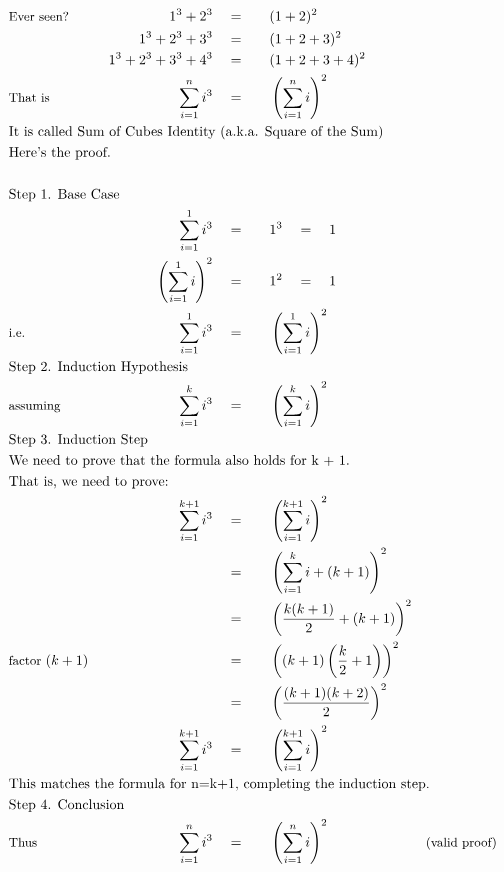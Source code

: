 \begin{alignat*}{5}
&\small\text{Ever seen?}\qquad&1^3+2^3\quad&=\quad&&(1+2)^2\\
&\,&1^3+2^3+3^3\quad&=&&(1+2+3)^2\\
&\,&1^3+2^3+3^3+4^3\quad&=&&(1+2+3+4)^2\\
&\small\text{That is}&\sum_{i=1}^{n}i^3\quad&=&&\left(\sum_{i=1}^{n}i\right)^2\\
&\rlap{\text{It is called Sum of Cubes Identity (a.k.a. Square of the Sum)}}\\
&\rlap{\text{Here's the proof.}}\\ \\
&\rlap{\text{Step 1. Base Case}}\\
&\,&\sum_{i=1}^{1}i^3\quad&=&&1^3\quad=\quad1\\
&\,&\left(\sum_{i=1}^{1}i\right)^2\quad&=&&1^2\quad=\quad1\\
&\small\text{i.e.}&\sum_{i=1}^{1}i^3\quad&=&&\left(\sum_{i=1}^{1}i\right)^2\\
&\rlap{\text{Step 2. Induction Hypothesis}}\\
&\small\text{assuming}&\sum_{i=1}^{k}i^3\quad&=&&\left(\sum_{i=1}^{k}i\right)^2\\
&\rlap{\text{Step 3. Induction Step}}\\
&\rlap{\text{We need to prove that the formula also holds for k + 1.}}\\
&\rlap{\text{That is, we need to prove:}}\\
&\,&\sum_{i=1}^{k+1}i^3\quad&=&&\left(\sum_{i=1}^{k+1}i\right)^2\\
&\,&\,&=&&\left(\sum_{i=1}^{k}i+(k+1)\right)^2\\
&\,&\,&=&&\left(\frac{k(k+1)}{2}+(k+1)\right)^2\\
&\small\text{factor }(k+1)&\,&=&&\left((k+1)\left(\frac{k}{2}+1\right)\right)^2\\
&\,&\,&=&&\left(\frac{(k+1)(k+2)}{2}\right)^2\\
&\,&\sum_{i=1}^{k+1}i^3\quad&=&&\left(\sum_{i=1}^{k+1}i\right)^2\\
&\rlap{\text{This matches the formula for }n=k+1\text{, completing the induction step.}}\\
&\rlap{\text{Step 4. Conclusion}}\\
&\small\text{Thus}&\sum_{i=1}^{n}i^3\quad&=&&\left(\sum_{i=1}^{n}i\right)^2\qquad&&\small\text{(valid proof)}\\
\end{alignat*}

